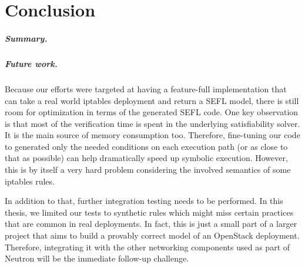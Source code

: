 \chapter{Conclusion}

\paragraph{Summary.}

\paragraph{Future work.}
Because our efforts were targeted at having a feature-full implementation that
can take a real world iptables deployment and return a SEFL model, there is
still room for optimization in terms of the generated SEFL code.  One key
observation is that most of the verification time is spent in the underlying
satisfiability solver.  It is the main source of memory consumption too.
Therefore, fine-tuning our code to generated only the needed conditions on each
execution path (or as close to that as possible) can help dramatically speed up
symbolic execution.  However, this is by itself a very hard problem considering
the involved semantics of some iptables rules.

In addition to that, further integration testing needs to be performed.  In
this thesis, we limited our tests to synthetic rules which might miss certain
practices that are common in real deployments.  In fact, this is just a small
part of a larger project that aims to build a provably correct model of an
OpenStack deployment.  Therefore, integrating it with the other networking
components used as part of Neutron will be the immediate follow-up challenge.
